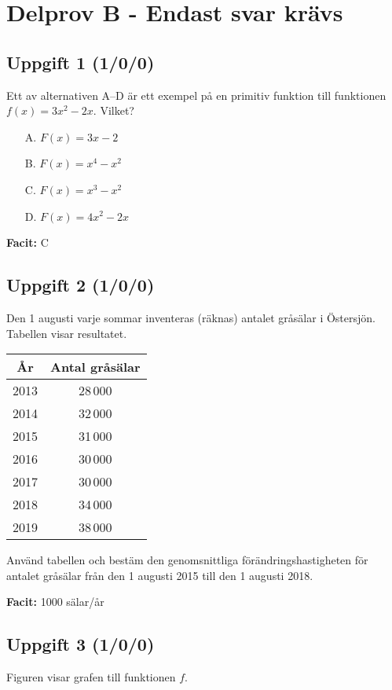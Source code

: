 \documentclass{article}
\begin{document}
\newpage

\section{Delprov B - Endast svar krävs}

\subsection*{Uppgift 1 (1/0/0)}
Ett av alternativen A--D är ett exempel på en primitiv funktion till funktionen $f(x) = 3x^2 - 2x$. Vilket?

\begin{itemize}
    \item[A.] $F(x) = 3x - 2$
    \item[B.] $F(x) = x^4 - x^2$
    \item[C.] $F(x) = x^3 - x^2$
    \item[D.] $F(x) = 4x^2 - 2x$
\end{itemize}

\textbf{Facit:} C

\subsection*{Uppgift 2 (1/0/0)}
Den 1 augusti varje sommar inventeras (räknas) antalet gråsälar i Östersjön. Tabellen visar resultatet.

\begin{center}
\begin{tabular}{|c|c|}
\hline
År & Antal gråsälar \\
\hline
2013 & 28\,000 \\
2014 & 32\,000 \\
2015 & 31\,000 \\
2016 & 30\,000 \\
2017 & 30\,000 \\
2018 & 34\,000 \\
2019 & 38\,000 \\
\hline
\end{tabular}
\end{center}

Använd tabellen och bestäm den genomsnittliga förändringshastigheten för antalet gråsälar från den 1 augusti 2015 till den 1 augusti 2018.

\textbf{Facit:} 1000 sälar/år

\subsection*{Uppgift 3 (1/0/0)}
Figuren visar grafen till funktionen $f$.
\end{document}
